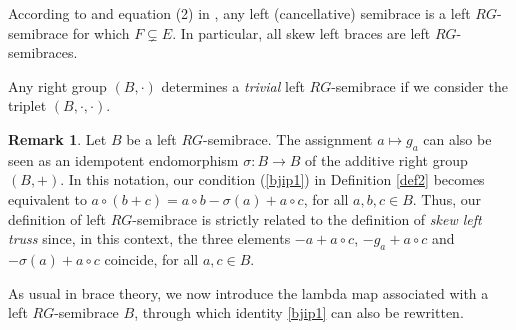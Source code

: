 \documentclass[11pt]{amsart}
\theoremstyle{definition}
\newtheorem{remark}[theorem]{Remark}
\begin{document}
According to \cite[p. 167]{CaCoSt17} and equation (2) in \cite[p. 134]{CaCeSt22}, any left (cancellative) semibrace is a left $RG$-semibrace for which $F\subsetneq E$. In particular, all skew left braces are left $RG$-semibraces. 

Any right group $(B,\cdot)$ determines a \emph{trivial} left $RG$-semibrace if we consider the triplet $(B, \cdot, \cdot)$.


\smallskip


\begin{remark}\label{remtruss} {\rm Let $B$ be a left $RG$-semibrace. %
The assignment $a\mapsto g_a$ can also be seen as an idempotent endomorphism $\sigma\colon B\to B$ of the additive right group $(B,+)$. In this notation, our condition (\ref{bjip1}) in Definition \ref{def2} becomes equivalent to $a\circ (b+ c) = a\circ b -\sigma(a) + a\circ c$, for all $a, b, c \in B$. Thus, our definition of left $RG$-semibrace is strictly related to the definition of \emph{skew left truss} \cite[Section~2]{Brze} since, in this context, the three elements $-a+a\circ c$, $-g_a + a\circ c$ and $-\sigma(a) + a\circ c$ coincide, for all $a, c\in B$.}
\end{remark}



\medskip


As usual in brace theory, we now introduce the lambda map associated with a left $RG$-semibrace $B$, through which identity \eqref{bjip1} can also be rewritten.
\end{document}

